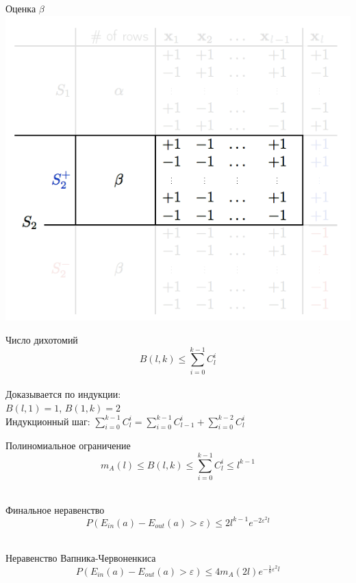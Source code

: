 \documentclass[10pt]{beamer}
\begin{document}
\begin{frame}{Оценка $\beta$}  
  \centering
  \includegraphics[width=\textwidth, height=0.8 \textheight, keepaspectratio]{images/breakpoint2}
\end{frame}

\begin{frame}{Число дихотомий}  
  $$B(l, k) \leq \sum\limits_{i=0}^{k-1} C_l^i$$\\
  Доказывается по индукции:\\
    \bigbreak
  $B(l, 1) = 1 $, \space $B(1, k) = 2 $\\
  \bigbreak
  Индукционный шаг:
  $\sum\limits_{i=0}^{k-1} C_l^i = \sum\limits_{i=0}^{k-1} C_{l-1}^i + \sum\limits_{i=0}^{k-2} C_l^i$
\end{frame}

\begin{frame}{Полиномиальное ограничение}  
  $$m_{A}(l) \leq B(l, k) \leq \sum\limits_{i=0}^{k-1} C_l^i \leq l^{k-1}$$\\
\end{frame}

\begin{frame}{Финальное неравенство}  
  $$P(E_{in}(a) - E_{out}(a) > \varepsilon) \leq 2 l^{k-1} e^{-2 \varepsilon^2 l}$$\\
\end{frame}

\begin{frame}{Неравенство Вапника-Червоненкиса}  
  $$P(E_{in}(a) - E_{out}(a) > \varepsilon) \leq 4 m_{A}(2l) e^{-\frac{1}{8}\varepsilon^2l}$$\\
  \bigbreak
\end{frame}
\end{document}

